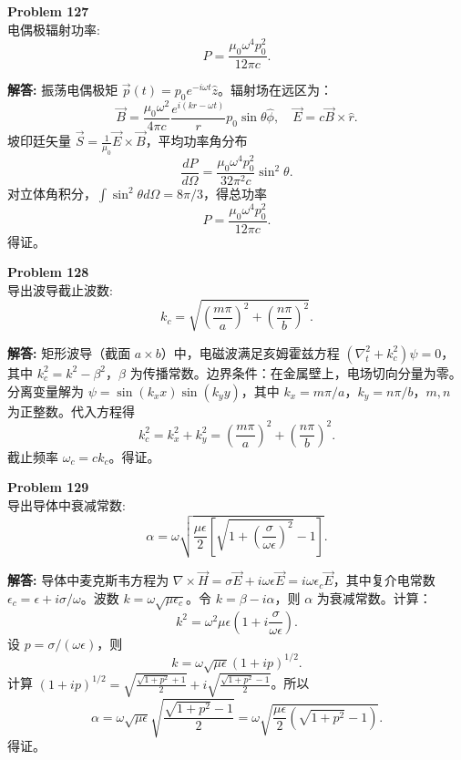 \documentclass[12pt, a4paper, oneside]{ctexart}
\newenvironment{solution}{\par\noindent\textbf{解答:}\quad}{\par}
\begin{document}
\begin{mdframed}[backgroundcolor=gray!10, linewidth=0pt]
    \textbf{Problem 127} \\
    电偶极辐射功率:
    \[
    P = \frac{\mu_0 \omega^4 p_0^2}{12\pi c}.
    \]
\end{mdframed}
\begin{solution}
    振荡电偶极矩 $\vec{p}(t) = p_0 e^{-i\omega t} \hat{z}$。辐射场在远区为：
    \[
    \vec{B} = \frac{\mu_0 \omega^2}{4\pi c} \frac{e^{i(kr-\omega t)}}{r} p_0 \sin\theta \hat{\phi}, \quad \vec{E} = c \vec{B} \times \hat{r}.
    \]
    坡印廷矢量 $\vec{S} = \frac{1}{\mu_0} \vec{E} \times \vec{B}$，平均功率角分布
    \[
    \frac{dP}{d\Omega} = \frac{\mu_0 \omega^4 p_0^2}{32\pi^2 c} \sin^2\theta.
    \]
    对立体角积分，$\int \sin^2\theta d\Omega = 8\pi/3$，得总功率
    \[
    P = \frac{\mu_0 \omega^4 p_0^2}{12\pi c}.
    \]
    得证。
\end{solution}

\begin{mdframed}[backgroundcolor=gray!10, linewidth=0pt]
    \textbf{Problem 128} \\
    导出波导截止波数:
    \[
    k_c = \sqrt{\left( \frac{m\pi}{a} \right)^2 + \left( \frac{n\pi}{b} \right)^2 }.
    \]
\end{mdframed}
\begin{solution}
    矩形波导（截面 $a \times b$）中，电磁波满足亥姆霍兹方程 $(\nabla_t^2 + k_c^2) \psi = 0$，其中 $k_c^2 = k^2 - \beta^2$，$\beta$ 为传播常数。边界条件：在金属壁上，电场切向分量为零。分离变量解为 $\psi = \sin(k_x x) \sin(k_y y)$，其中 $k_x = m\pi/a$，$k_y = n\pi/b$，$m,n$ 为正整数。代入方程得
    \[
    k_c^2 = k_x^2 + k_y^2 = \left( \frac{m\pi}{a} \right)^2 + \left( \frac{n\pi}{b} \right)^2.
    \]
    截止频率 $\omega_c = c k_c$。得证。
\end{solution}

\begin{mdframed}[backgroundcolor=gray!10, linewidth=0pt]
    \textbf{Problem 129} \\
    导出导体中衰减常数:
    \[
    \alpha = \omega \sqrt{ \frac{\mu\epsilon}{2} \left[ \sqrt{1 + \left( \frac{\sigma}{\omega\epsilon} \right)^2 } - 1 \right] }.
    \]
\end{mdframed}
\begin{solution}
    导体中麦克斯韦方程为 $\nabla \times \vec{H} = \sigma \vec{E} + i\omega \epsilon \vec{E} = i\omega \epsilon_c \vec{E}$，其中复介电常数 $\epsilon_c = \epsilon + i\sigma/\omega$。波数 $k = \omega \sqrt{\mu \epsilon_c}$。令 $k = \beta - i\alpha$，则 $\alpha$ 为衰减常数。计算：
    \[
    k^2 = \omega^2 \mu \epsilon \left( 1 + i \frac{\sigma}{\omega\epsilon} \right).
    \]
    设 $p = \sigma/(\omega\epsilon)$，则
    \[
    k = \omega \sqrt{\mu\epsilon} (1 + i p)^{1/2}.
    \]
    计算 $(1+ip)^{1/2} = \sqrt{\frac{\sqrt{1+p^2}+1}{2}} + i \sqrt{\frac{\sqrt{1+p^2}-1}{2}}$。所以
    \[
    \alpha = \omega \sqrt{\mu\epsilon} \sqrt{ \frac{\sqrt{1+p^2}-1}{2} } = \omega \sqrt{ \frac{\mu\epsilon}{2} \left( \sqrt{1+p^2} - 1 \right) }.
    \]
    得证。
\end{solution}
\end{document}
